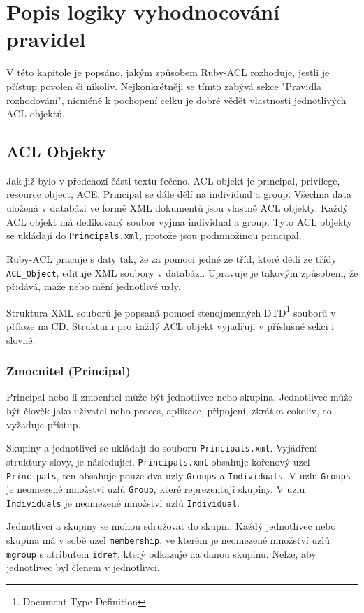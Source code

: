 \section{Popis logiky vyhodnocování pravidel}
V této kapitole je popsáno, jakým způsobem Ruby-ACL rozhoduje, jestli je přístup povolen či nikoliv. Nejkonkrétněji se tímto zabývá sekce "Pravidla rozhodování", nicméně k pochopení celku je dobré vědět vlastnosti jednotlivých ACL objektů.

\subsection{ACL Objekty}
Jak již bylo v předchozí části textu řečeno. ACL objekt je principal, privilege, resource object, ACE. Principal se dále dělí na individual a group. Všechna data uložená v databázi ve formě XML dokumentů jsou vlastně  ACL objekty. Každý ACL objekt má dedikovaný soubor vyjma individual a group. Tyto ACL objekty se ukládají do \verb|Principals.xml|, protože jsou podmnožinou principal.

Ruby-ACL pracuje s daty tak, že za pomoci jedné ze tříd, které dědí ze třídy \verb|ACL_Object|, edituje XML soubory v databázi. Upravuje je takovým způsobem, že přidává, maže nebo mění jednotlivé uzly.

Struktura XML souborů je popsaná pomocí stenojmenných DTD\footnote{Document Type Definition} souborů v příloze na CD. Strukturu pro každý ACL objekt vyjadřuji v příslušné sekci i slovně.

\subsubsection {Zmocnitel (Principal)}
Principal nebo-li zmocnitel může být jednotlivec nebo skupina. Jednotlivec může být člověk jako uživatel nebo proces, aplikace, připojení, zkrátka cokoliv, co vyžaduje přístup.

Skupiny a jednotlivci se ukládají do souboru \verb|Principals.xml|.
Vyjádření struktury slovy, je následující. \verb|Principals.xml| obsahuje kořenový uzel \verb|Principals|, ten obsahuje pouze dva uzly \verb|Groups| a \verb|Individuals|. V uzlu \verb|Groups| je neomezené množství uzlů \verb|Group|, které reprezentují skupiny. V uzlu \verb|Individuals| je neomezené množství uzlů \verb|Individual|.

Jednotlivci a skupiny se mohou sdružovat do skupin. Každý jednotlivec nebo skupina má v sobě uzel \verb|membership|, ve kterém je neomezené množství uzlů \verb|mgroup| s atributem \verb|idref|, který odkazuje na danou skupinu. Nelze, aby jednotlivec byl členem v jednotlivci.

